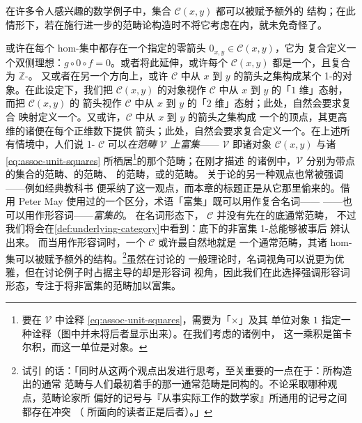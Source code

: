 在许多令人感兴趣的数学例子中，集合 $\mathcal{C}(x,y)$ 都可以被赋予额外的
结构；在此情形下，若在施行进一步的范畴论构造时不将它考虑在内，就未免奇怪了。

或许在每个 hom-集中都存在一个指定的零箭头 $0_{x,y}\in\mathcal{C}(x,y)$，它为
复合定义一个双侧理想：$g\circ 0\circ f=0$。或者将此延伸，或许每个
$\mathcal{C}(x,y)$ 都是一个\trAbelianGroup{}，且复合为 $\mathbb{Z}$-\trBilinear。
又或者在另一个方向上，或许 $\mathcal{C}$ 中从 $x$ 到 $y$ 的箭头之集构成某个
1-\trCategory{}的对象。在此设定下，我们把 $\mathcal{C}(x,y)$ 的对象视作
$\mathcal{C}$ 中从 $x$ 到 $y$ 的「$1$ 维」态射，而把 $\mathcal{C}(x,y)$ 的
箭头视作 $\mathcal{C}$ 中从 $x$ 到 $y$ 的「$2$ 维」态射；此处，自然会要求复合
映射定义一个\trFunctor。又或许，$\mathcal{C}$ 中从 $x$ 到 $y$ 的箭头之集构成
一个\trSimplicialSet{}的顶点，其更高维的诸\trSimplex{}便在每个正维数下提供
箭头；此处，自然会要求复合定义一个\trSimplicialMap。在上述所有情境中，人们说
1-\trCategory{} $\mathcal{C}$ 可以\emph{在范畴 $\mathcal{V}$ 上富集}——%
$\mathcal{V}$ 即诸对象 $\mathcal{C}(x,y)$ 与诸\trDiagram{}
\eqref{eq:assoc-unit-squares} 所栖居\footnote{要在 $\mathcal{V}$ 中诠释%
\trDiagram{} \eqref{eq:assoc-unit-squares}，需要为\trMonoidalProduct「$\times$」及其
单位对象 $1$ 指定一种诠释（图中并未将后者显示出来）。在我们考虑的诸例中，
这一乘积是笛卡尔积，而这一单位是\trTerminal{}对象。}的那个范畴；在刚才描述
的诸例中，$\mathcal{V}$ 分别为带点的集合的范畴、\trAbelianGroup{}的范畴、%
\trCategory{}的范畴，或\trSimplicialSet{}的范畴。
关于\trEnrichedCategory{}论的另一种观点也常被强调——例如经典教科书%
\cite{bib68} 便采纳了这一观点，而本章的标题正是从它那里偷来的。借用%
Peter May 使用过的一个区分，术语「富集」既可以用作复合名词——%
\emph{\trEnrichedCategory}——也可以用作形容词——\emph{富集的}\trCategory。
在名词形态下，\trEnrichedCategory{} $\mathcal{C}$ 并没有先在的底通常范畴，
不过我们将会在\cref{def:underlying-category}中看到：底下的非富集 1-\trCategory{}总能够被事后
辨认出来。
而当用作形容词时，一个\trEnrichedCategory{} $\mathcal{C}$ 或许最自然地就是
一个通常范畴，其诸 hom-集可以被赋予额外的结构。\footnote{试引 \cite{bib84}
的话：「同时从这两个观点出发进行思考，至关重要的一点在于：所构造出的通常
范畴与人们最初着手的那一通常范畴是同构的。不论采取哪种观点，范畴论家所
偏好的记号与『从事实际工作的数学家』所通用的记号之间都存在冲突
（\cite{bib81} 所面向的读者正是后者）。」}虽然在讨论\trEnrichedCategory{}的
一般理论时，名词视角可以说更为优雅，但在讨论例子时占据主导的却是形容词
视角，因此我们在此选择强调形容词形态，专注于将非富集的范畴加以富集。

